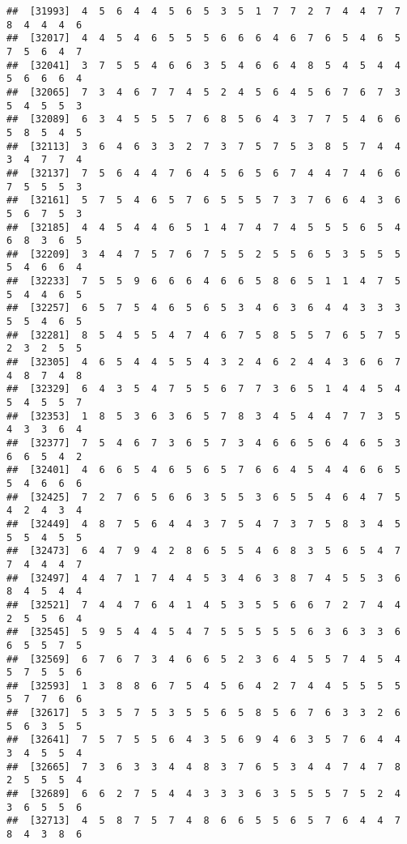\documentclass[
]{book}
\begin{document}
\begin{verbatim}
##  [31993]  4  5  6  4  4  5  6  5  3  5  1  7  7  2  7  4  4  7  7  8  4  4  4  6
##  [32017]  4  4  5  4  6  5  5  5  6  6  6  4  6  7  6  5  4  6  5  7  5  6  4  7
##  [32041]  3  7  5  5  4  6  6  3  5  4  6  6  4  8  5  4  5  4  4  5  6  6  6  4
##  [32065]  7  3  4  6  7  7  4  5  2  4  5  6  4  5  6  7  6  7  3  5  4  5  5  3
##  [32089]  6  3  4  5  5  5  7  6  8  5  6  4  3  7  7  5  4  6  6  5  8  5  4  5
##  [32113]  3  6  4  6  3  3  2  7  3  7  5  7  5  3  8  5  7  4  4  3  4  7  7  4
##  [32137]  7  5  6  4  4  7  6  4  5  6  5  6  7  4  4  7  4  6  6  7  5  5  5  3
##  [32161]  5  7  5  4  6  5  7  6  5  5  5  7  3  7  6  6  4  3  6  5  6  7  5  3
##  [32185]  4  4  5  4  4  6  5  1  4  7  4  7  4  5  5  5  6  5  4  6  8  3  6  5
##  [32209]  3  4  4  7  5  7  6  7  5  5  2  5  5  6  5  3  5  5  5  5  4  6  6  4
##  [32233]  7  5  5  9  6  6  6  4  6  6  5  8  6  5  1  1  4  7  5  5  4  4  6  5
##  [32257]  6  5  7  5  4  6  5  6  5  3  4  6  3  6  4  4  3  3  3  5  5  4  6  5
##  [32281]  8  5  4  5  5  4  7  4  6  7  5  8  5  5  7  6  5  7  5  2  3  2  5  5
##  [32305]  4  6  5  4  4  5  5  4  3  2  4  6  2  4  4  3  6  6  7  4  8  7  4  8
##  [32329]  6  4  3  5  4  7  5  5  6  7  7  3  6  5  1  4  4  5  4  5  4  5  5  7
##  [32353]  1  8  5  3  6  3  6  5  7  8  3  4  5  4  4  7  7  3  5  4  3  3  6  4
##  [32377]  7  5  4  6  7  3  6  5  7  3  4  6  6  5  6  4  6  5  3  6  6  5  4  2
##  [32401]  4  6  6  5  4  6  5  6  5  7  6  6  4  5  4  4  6  6  5  5  4  6  6  6
##  [32425]  7  2  7  6  5  6  6  3  5  5  3  6  5  5  4  6  4  7  5  4  2  4  3  4
##  [32449]  4  8  7  5  6  4  4  3  7  5  4  7  3  7  5  8  3  4  5  5  5  4  5  5
##  [32473]  6  4  7  9  4  2  8  6  5  5  4  6  8  3  5  6  5  4  7  7  4  4  4  7
##  [32497]  4  4  7  1  7  4  4  5  3  4  6  3  8  7  4  5  5  3  6  8  4  5  4  4
##  [32521]  7  4  4  7  6  4  1  4  5  3  5  5  6  6  7  2  7  4  4  2  5  5  6  4
##  [32545]  5  9  5  4  4  5  4  7  5  5  5  5  5  6  3  6  3  3  6  6  5  5  7  5
##  [32569]  6  7  6  7  3  4  6  6  5  2  3  6  4  5  5  7  4  5  4  5  7  5  5  6
##  [32593]  1  3  8  8  6  7  5  4  5  6  4  2  7  4  4  5  5  5  5  5  7  7  6  6
##  [32617]  5  3  5  7  5  3  5  5  6  5  8  5  6  7  6  3  3  2  6  5  6  3  5  5
##  [32641]  7  5  7  5  5  6  4  3  5  6  9  4  6  3  5  7  6  4  4  3  4  5  5  4
##  [32665]  7  3  6  3  3  4  4  8  3  7  6  5  3  4  4  7  4  7  8  2  5  5  5  4
##  [32689]  6  6  2  7  5  4  4  3  3  3  6  3  5  5  5  7  5  2  4  3  6  5  5  6
##  [32713]  4  5  8  7  5  7  4  8  6  6  5  5  6  5  7  6  4  4  7  8  4  3  8  6

\end{verbatim}
\end{document}
